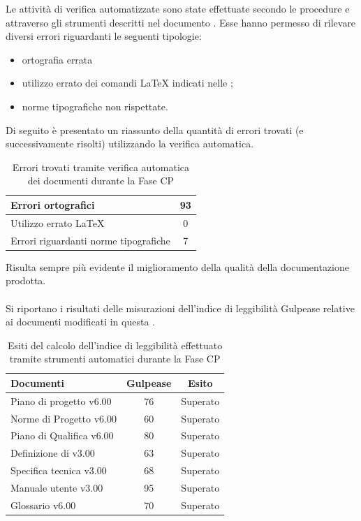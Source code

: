 Le attività di verifica automatizzate sono state effettuate secondo le procedure e attraverso gli strumenti descritti nel documento . Esse hanno permesso di rilevare diversi errori riguardanti le seguenti tipologie:
\begin{itemize}
\item ortografia errata
\item utilizzo errato dei comandi \LaTeX{} indicati nelle ;
\item norme tipografiche non rispettate.
\end{itemize}
Di seguito è presentato un riassunto della quantità di errori trovati (e successivamente risolti) utilizzando la verifica automatica.
\begin{table}[H]
	\centering
		\begin{tabu}{| l | c |}
			\hline
			Errori ortografici	& 93	\\ \hline
			Utilizzo errato \LaTeX{}	& 0	\\ \hline
			Errori riguardanti norme tipografiche	& 7	\\ \hline
		\end{tabu}
	\caption{Errori trovati tramite verifica automatica dei documenti durante la Fase CP}
\end{table}

Risulta sempre più evidente il miglioramento della qualità della documentazione prodotta.\\ \\
Si riportano i risultati delle misurazioni dell'indice di leggibilità Gulpease relative ai documenti modificati in questa .


\begin{table}[H]
	\centering
		\begin{tabu}{| l | c | c |}
			\hline
			Documenti 							& Gulpease	& Esito		\\ \hline \hline
			Piano di progetto v6.00				& 76 		& Superato  \\ \hline
			Norme di Progetto v6.00 			& 60		& Superato  \\ \hline
			Piano di Qualifica v6.00 			& 80		& Superato  \\ \hline
			Definizione di  v3.00		& 63		& Superato  \\ \hline
			Specifica tecnica v3.00				& 68		& Superato \\ \hline
			Manuale utente v3.00				& 95		& Superato \\ \hline
			Glossario v6.00					 	& 70 		& Superato  \\ \hline
		\end{tabu}
	\caption{Esiti del calcolo dell'indice di leggibilità effettuato tramite strumenti automatici durante la Fase CP}
\end{table}

